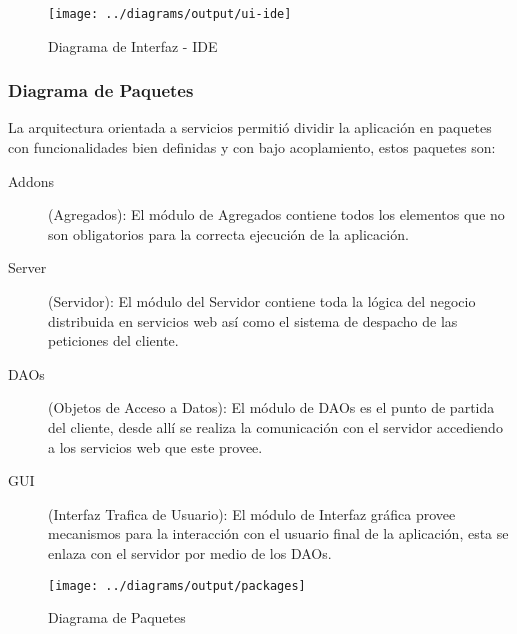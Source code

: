 \begin{landscape}
\begin{figure}
 \centering
 \texttt{[image: ../diagrams/output/ui-ide]}
 \caption{Diagrama de Interfaz - IDE}
 \label{diagrama:ui-ide}
\end{figure}
\end{landscape}


\subsubsection{Diagrama de Paquetes}

La arquitectura orientada a servicios permitió dividir la aplicación en paquetes con funcionalidades bien definidas y con bajo acoplamiento, estos paquetes son:

\begin{description}
	
	\item[Addons] (Agregados):\newline
	El módulo de Agregados contiene todos los elementos que no son obligatorios para la correcta ejecución de la aplicación.
	
	\item[Server] (Servidor):\newline
	El módulo del Servidor contiene toda la lógica del negocio distribuida en servicios web así como el sistema de despacho de las peticiones del cliente.
	
	\item[DAOs] (Objetos de Acceso a Datos):\newline
	El módulo de DAOs es el punto de partida del cliente, desde allí se realiza la comunicación con el servidor accediendo a los servicios web que este provee.
	
	\item[GUI] (Interfaz Trafica de Usuario):\newline
	El módulo de Interfaz gráfica provee mecanismos para la interacción con el usuario final de la aplicación, esta se enlaza con el servidor por medio de los DAOs.
	
\end{description}

\begin{landscape}
\begin{figure}
 \centering
 \texttt{[image: ../diagrams/output/packages]}
 \caption{Diagrama de Paquetes}
 \label{diagrama:paquetes}
\end{figure}
\end{landscape}


